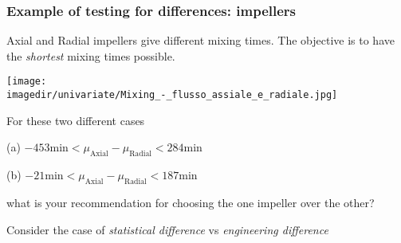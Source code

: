 \begin{frame}\frametitle{Example of testing for differences: impellers}

	Axial and Radial impellers give different mixing times. The objective is to have the \emph{shortest} mixing times possible.
	\begin{center}
		\texttt{[image: \\imagedir/univariate/Mixing\_-\_flusso\_assiale\_e\_radiale.jpg]}
	\end{center}
	\vspace{-6pt}
	For these two different cases

	(a) $-453 \text{min} < \mu_\text{Axial} - \mu_\text{Radial} < 284 \text{min} $

	(b) $-21 \text{min} < \mu_\text{Axial} - \mu_\text{Radial} < 187 \text{min} $

	what is your recommendation for choosing the one impeller over the other?

	Consider the case of \emph{statistical difference} vs \emph{engineering difference}
\end{frame}

